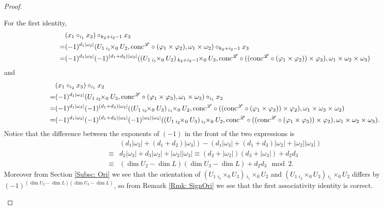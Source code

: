 \documentclass[10pt]{amsart}
\numberwithin{equation}{section}
\theoremstyle{plain}
\theoremstyle{definition}
\theoremstyle{remark}
\numberwithin{equation}{section}
\newcommand{\fiberprod}[2]{\,_{#1}\!\!\times_{#2} }
\newcommand{\conc}{\textup{conc}^\mathscr{L}}
\begin{document}
{\begin{proof}
\begin{enumerate}
	For the first identity, 
	\begin{align*}
		&(x_1\circ_{i_1}x_2)\circ_{k_2+i_2-1} x_3 \\ =& (-1)^{d_1|\omega_2|}(U_1\fiberprod{i_1}{0} U_2, \conc \circ(\varphi_1\times \varphi_2), \omega_1\times \omega_2 )\circ_{k_2+i_2-1}x_3\\
		=&(-1)^{d_1|\omega_2|}(-1)^{(d_1+d_2)|\omega_3|}((U_1\fiberprod{i_1}{0}U_2)\fiberprod{k_2+i_2-1}{0}U_3 , \conc\circ((\conc\circ(\varphi_1\times \varphi_2))\times \varphi_3), \omega_1\times \omega_2\times \omega_3 )
	\end{align*}
	and 
	\begin{align*}
		&(x_1\circ_{i_2}x_3)\circ_{i_1} x_2\\
		=& (-1)^{d_1|\omega_3|}(U_1\fiberprod{i_2}{0}U_3,\conc \circ( \varphi_1\times \varphi_3),  \omega_1\times \omega_3)\circ_{i_1} x_2\\
		=& (-1)^{d_1|\omega_3|}(-1)^{(d_1+d_3)|\omega_2|}((U_1\fiberprod{i_2}{0}U_3)\fiberprod{i_1}{0}U_2, \conc\circ((\conc\circ(\varphi_1\times\varphi_3))\times \varphi_2), \omega_1\times \omega_3\times \omega_2)\\
		=& (-1)^{d_1|\omega_3|}(-1)^{(d_1+d_3)|\omega_2|}(-1)^{|\omega_2||\omega_3|}((U_1\fiberprod{i_2}{0}U_3)\fiberprod{i_1}{0}U_2, \conc\circ((\conc\circ(\varphi_1\times\varphi_3))\times \varphi_2), \omega_1\times \omega_2\times \omega_3).
	\end{align*}
	Notice that the difference between the exponents of $(-1)$ in the front of the two expressions is 
	\begin{align*}
		&(d_1|\omega_2|+(d_1+d_2)|\omega_3|)- (d_1|\omega_3|+(d_1+d_3)|\omega_2|+|\omega_2||\omega_3| ) \\
		\equiv & d_2|\omega_3|+ d_3|\omega_2|+|\omega_2||\omega_3| \equiv (d_2+|\omega_2|)(d_3+|\omega_3|)+d_2d_3\\
		\equiv &  (\dim U_2 -\dim L)(\dim U_3-\dim L) + d_2d_3\mod 2.
	\end{align*}
	Moreover from Section \ref{Subsc: Ori} we see that the orientation of $(U_1\fiberprod{i_2}{0}U_3)\fiberprod{i_1}{0}U_2$ and $(U_1\fiberprod{i_2}{0}U_3)\fiberprod{i_1}{0}U_2$ differs by $(-1)^{(\dim U_2-\dim L)(\dim U_3-\dim L)}$, so from Remark \ref{Rmk: SignOri} we see that the first associativity identity is correct.
	

\end{enumerate}
\end{proof}}
\end{document}
